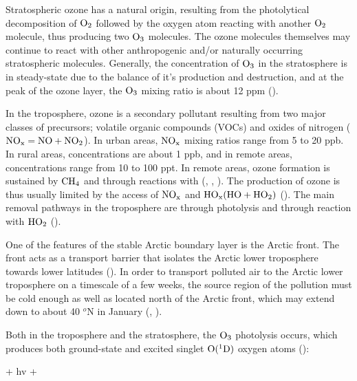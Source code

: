 \medskip

Stratospheric ozone has a natural origin, resulting from the photolytical decomposition of $\mathrm{O_2}$ followed by the oxygen atom reacting with another $\mathrm{O_2}$ molecule, thus producing two $\mathrm{O_3}$ molecules. The ozone molecules themselves may continue to react with other anthropogenic and/or naturally occurring stratospheric molecules. Generally, the concentration of $\mathrm{O_3}$ in the stratosphere is in steady-state due to the balance of it's production and destruction, and at the peak of the ozone layer, the $\mathrm{O_3}$ mixing ratio is about 12 ppm (\cite{SeinfeldSpyros}).  

\medskip

In the troposphere, ozone is a secondary pollutant resulting from two major classes of precursors; volatile organic compounds (VOCs) and oxides of nitrogen ($\mathrm{NO_x} = \mathrm{NO} + \mathrm{NO_2}$). In urban areas, $\mathrm{NO_x}$ mixing ratios range from 5 to 20 ppb. In rural areas, concentrations are about 1 ppb, and in remote areas, concentrations range from 10 to 100 ppt. In remote areas, ozone formation is sustained by $\mathrm{CH_4}$ and  through reactions with  (\cite{Cadle1970}, \cite{Levy1971}, \cite{SeinfeldSpyros}). The production of ozone is thus usually limited by the access of $\mathrm{NO_x}$ and $\mathrm{HO_x} (\mathrm{HO} + \mathrm{HO_2})$ (\cite{Levy1971}). The main removal pathways in the troposphere are through photolysis and through reaction with $\mathrm{HO_2}$ (\cite{SeinfeldSpyros}).

\medskip

One of the features of the stable Arctic boundary layer is the Arctic front. The front acts as a transport barrier that isolates the Arctic lower troposphere towards lower latitudes (\cite{BARRIE1986643}). In order to transport polluted air to the Arctic lower troposphere on a timescale of a few weeks, the source region of the pollution must be cold enough as well as located north of the Arctic front, which may extend down to about 40 $^o$N in January (\cite{BARRIE1986643}, \cite{AMAP2015}). 


\medskip

Both in the troposphere and the stratosphere, the $\mathrm{O_3}$ photolysis occurs, which produces both ground-state  and excited singlet $\mathrm{O(^1D)}$ oxygen atoms (\cite{SeinfeldSpyros}): 

\begin{reaction}
     + hv \rightarrow {} + 
    \label{rqn:groundstate_O2}
\end{reaction}

